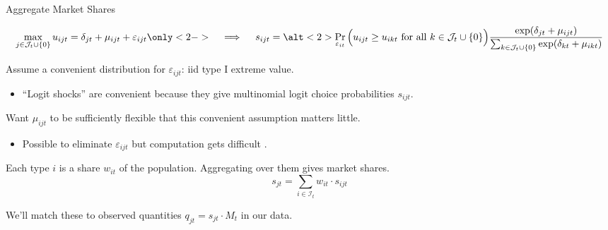 \documentclass[aspectratio=169,t,11pt,table]{beamer}
\begin{document}
\begin{frame}{Aggregate Market Shares}
    \vspace{-1.5\baselineskip}
    \begin{minipage}[c][4\baselineskip][c]{\textwidth}
        \begin{equation*}
            \max_{j \in \mathcal{J}_t \cup \{0\}} u_{ijt} = \delta_{jt} + \mu_{ijt} + \varepsilon_{ijt} \only<2->{\quad\implies\quad s_{ijt} = \alt<2>{\Pr_{\varepsilon_{it}}\Big(u_{ijt} \geq u_{ikt} \text{ for all } k \in \mathcal{J}_t \cup \{0\}\Big)}{\frac{\exp(\delta_{jt} + \mu_{ijt})}{\sum_{k \in \mathcal{J}_t \cup \{0\}} \exp(\delta_{kt} + \mu_{ikt})}}}
        \end{equation*}
    \end{minipage}
    \vspace{-0.5\baselineskip}
    \begin{wideitemize}
        \item Assume a convenient distribution for $\varepsilon_{ijt}$: iid type I extreme value.
        \pause
        \begin{itemize}
            \item ``Logit shocks'' are convenient because they give multinomial logit choice probabilities $s_{ijt}$.
        \end{itemize}
        \pause\pause
        \item Want $\mu_{ijt}$ to be sufficiently flexible that this convenient assumption matters little.
        \begin{itemize}
            \item Possible to eliminate $\varepsilon_{ijt}$ but computation gets difficult \citep{berry2007pure}.
        \end{itemize}
        \pause
        \item Each type $i$ is a share $w_{it}$ of the population. Aggregating over them gives market shares.
        \begin{equation*}
            s_{jt} = \sum_{i \in \mathcal{I}_t} w_{it} \cdot s_{ijt}
        \end{equation*}
        \vspace{-1.5\baselineskip}
        \pause
        \item We'll match these to observed quantities $q_{jt} = s_{jt} \cdot M_t$ in our data.
    \end{wideitemize}
\end{frame}
\end{document}
